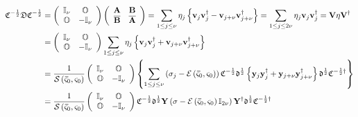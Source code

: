 \documentclass[aps,preprint]{revtex4}%
\begin{document}
\begin{align}
\mathfrak{C}^{-\frac{1}{2}}\mathfrak{DC}^{-\frac{1}{2}}  &  =\left(
\begin{array}
[c]{cc}%
\mathbb{I}_{\nu} & \mathbb{O}\\
\mathbb{O} & -\mathbb{I}_{\nu}%
\end{array}
\right)  \left(
\begin{array}
[c]{cc}%
\mathbf{A} & \mathbf{B}\\
\overline{\mathbf{B}} & \overline{\mathbf{A}}%
\end{array}
\right)  =\sum_{1\leq j\leq\nu}\eta_{j}\left\{  \mathbf{v}_{j}\mathbf{v}%
_{j}^{\dagger}-\mathbf{v}_{j+\nu}\mathbf{v}_{j+\nu}^{\dagger}\right\}
=\sum_{1\leq j\leq2\nu}\eta_{j}\mathbf{v}_{j}\mathbf{v}_{j}^{\dagger
}=\mathbf{V\eta V}^{\dagger}\nonumber\\
&  =\left(
\begin{array}
[c]{cc}%
\mathbb{I}_{\nu} & \mathbb{O}\\
\mathbb{O} & -\mathbb{I}_{\nu}%
\end{array}
\right)  \sum_{1\leq j\leq\nu}\eta_{j}\left\{  \mathbf{v}_{j}\mathbf{v}%
_{j}^{\dagger}+\mathbf{v}_{j+\nu}\mathbf{v}_{j+\nu}^{\dagger}\right\}
\nonumber\\
&  =\frac{1}{\mathcal{S}\left(  \mathbf{\bar{\varsigma}}_{0},\mathbf{\varsigma
}_{0}\right)  }\left(
\begin{array}
[c]{cc}%
\mathbb{I}_{\nu} & \mathbb{O}\\
\mathbb{O} & -\mathbb{I}_{\nu}%
\end{array}
\right)  \left\{  \sum_{1\leq j\leq\nu}\left(  \sigma_{j}-\mathcal{E}\left(
\mathbf{\bar{\varsigma}}_{0},\mathbf{\varsigma}_{0}\right)  \right)
\mathfrak{C}^{-\frac{1}{2}}\mathfrak{\Delta}^{\frac{1}{2}}\left\{
\mathbf{y}_{j}\mathbf{y}_{j}^{\dagger}+\mathbf{y}_{j+\nu}\mathbf{y}_{j+\nu
}^{\dagger}\right\}  \mathfrak{\Delta}^{\frac{1}{2}}\mathfrak{C}^{-\frac{1}%
{2}\dagger}\right\} \nonumber\\
&  =\frac{1}{\mathcal{S}\left(  \mathbf{\bar{\varsigma}}_{0},\mathbf{\varsigma
}_{0}\right)  }\left(
\begin{array}
[c]{cc}%
\mathbb{I}_{\nu} & \mathbb{O}\\
\mathbb{O} & -\mathbb{I}_{\nu}%
\end{array}
\right)  \mathfrak{C}^{-\frac{1}{2}}\mathfrak{\Delta}^{\frac{1}{2}}%
\mathbf{Y}\left(  \mathbf{\sigma}-\mathcal{E}\left(  \mathbf{\bar{\varsigma}%
}_{0},\mathbf{\varsigma}_{0}\right)  \mathbb{I}_{2\nu}\right)  \mathbf{Y}%
^{\dagger}\mathfrak{\Delta}^{\frac{1}{2}}\mathfrak{C}^{-\frac{1}{2}\dagger}%
\end{align}
\end{document}
